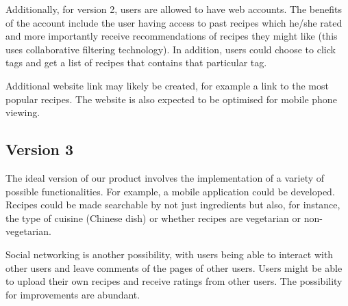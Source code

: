 Additionally, for version 2, users are allowed to have web accounts. The benefits of the account include the user having access to past recipes which he/she rated and more importantly receive recommendations of recipes they might like (this uses collaborative filtering technology). In addition, users could choose to click tags and get a list of recipes that contains that particular tag.

Additional website link may likely be created, for example a link to the most popular recipes. The website is also expected to be optimised for mobile phone viewing.

\subsection{Version 3}
The ideal version of our product involves the implementation of a variety of possible functionalities. For example, a mobile application could be developed. Recipes could be made searchable by not just ingredients but also, for instance, the type of cuisine (Chinese dish) or whether recipes are vegetarian or non-vegetarian. 

Social networking is another possibility, with users being able to interact with other users and leave comments of the pages of other users. Users might be able to upload their own recipes and receive ratings from other users. The possibility for improvements are abundant.
